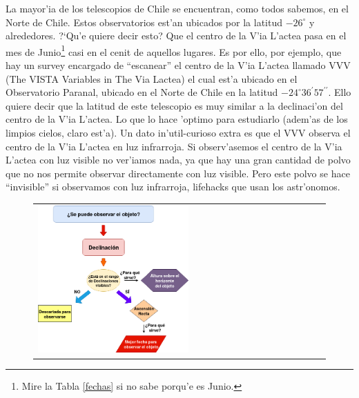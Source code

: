 \documentclass{article}
\begin{document}
\begin{enumerate}[a)]
\begin{enumerate} [i)]
La mayor'ia de los telescopios de Chile se encuentran, como todos sabemos, en el Norte de Chile. Estos observatorios est'an ubicados por la latitud $-26^\circ$ y alrededores. ?`Qu'e quiere decir esto? Que el centro de la V'ia L'actea pasa en el mes de Junio\footnote{Mire la Tabla \ref{fechas} si no sabe porqu'e es Junio.} casi en el cenit de aquellos lugares. Es por ello, por ejemplo, que hay un survey encargado de ``escanear'' el centro de la V'ia L'actea llamado VVV (The VISTA Variables in The Via Lactea) el cual est'a ubicado en el Observatorio Paranal, ubicado en el Norte de Chile en la latitud $-24^\circ36^\prime57^{\prime \prime}$. Ello quiere decir que la latitud de este telescopio es muy similar a la declinaci'on del centro de la V'ia L'actea. Lo que lo hace 'optimo para estudiarlo (adem'as de los limpios cielos, claro est'a). Un dato in'util-curioso extra es que el VVV observa el centro de la V'ia L'actea en luz infrarroja. Si observ'asemos el centro de la V'ia L'actea con luz visible no ver'iamos nada, ya que hay una gran cantidad de polvo que no nos permite observar directamente con luz visible. Pero este polvo se hace ``invisible'' si observamos con luz infrarroja, lifehacks que usan los astr'onomos.

\end{enumerate}
\end{enumerate}

\begin{figure}[!ht]
\begin{center}
\begin{tabular}{ll}
  \includegraphics[width=0.55\textwidth]{diagrama.png} 
\end{tabular}
\end{center} 
\end{figure}
\end{document}
